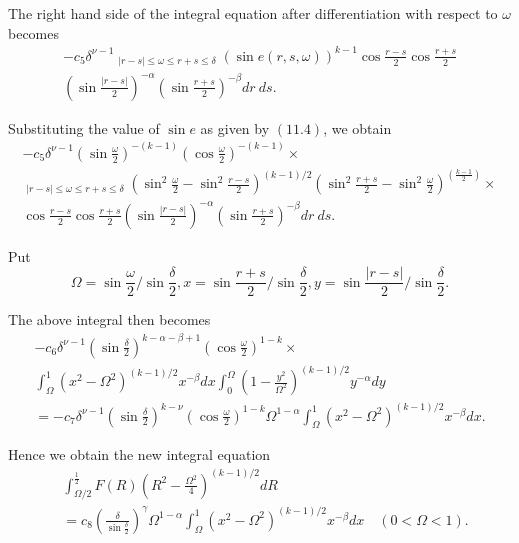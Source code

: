 The right hand side of the integral equation after differentiation with respect to $\omega$ becomes
\begin{multline*}
-c_{5} \delta^{\nu-1} \mathop{\int_{0}^{\delta} \int_{0}^{\delta}}_{|r-s|\leq \omega \leq r+s \leq \delta} (\sin e(r, s, \omega))^{k-1} \cos \frac{r-s}{2} \cos \frac{r+s}{2}\\ 
\left(\sin \frac{|r-s|}{2}\right)^{-\alpha} \left(\sin \frac{r+s}{2}\right)^{-\beta} dr ~ ds.
\end{multline*}

Substituting the value of $\sin e$ as given by $(11.4)$, we obtain
\begin{multline*}
-c_{5} \delta^{\nu-1} \left(\sin \frac{\omega}{2}\right)^{-(k-1)} \left(\cos \frac{\omega}{2}\right)^{-(k-1)} \times \\
\mathop{\int_{0}^{\delta} \int_{0}^{\delta}}_{|r-s|\leq \omega \leq r+s \leq \delta} \left(\sin^{2} \frac{\omega}{2} - \sin^{2} \frac{r-s}{2}\right)^{(k-1)/2} \left(\sin^{2} \frac{r+s}{2} - \sin^{2} \frac{\omega}{2}\right)^{\left(\frac{k-1}{2}\right)} \times\\
\cos \frac{r-s}{2} \cos \frac{r+s}{2} \left(\sin \frac{|r-s|}{2}\right)^{-\alpha} \left(\sin \frac{r+s}{2}\right)^{-\beta}dr~ds.
\end{multline*}

Put
$$
\Omega = \sin \frac{\omega}{2} / \sin \frac{\delta}{2}, x = \sin \frac{r+s}{2}/\sin \frac{\delta}{2}, y = \sin \frac{|r-s|}{2}/\sin \frac{\delta}{2}.
$$

The above integral then becomes
\begin{multline*}
-c_{6} \delta^{\nu - 1} (\sin \frac{\delta}{2})^{k-\alpha-\beta+1} (\cos \frac{\omega}{2})^{1-k} \times\\
\int_{\Omega}^{1} (x^{2} - \Omega^{2})^{(k-1)/2} x^{-\beta} dx \int_{0}^{\Omega} (1 - \frac{y^{2}}{\Omega^{2}})^{(k-1)/2} y^{-\alpha} dy\\
= -c_{7} \delta^{\nu - 1} (\sin \frac{\delta}{2})^{k-\nu} (\cos \frac{\omega}{2})^{1-k} \Omega^{1-\alpha} \int_{\Omega}^{1} (x^{2} - \Omega^{2})^{(k-1)/2} x^{-\beta} dx.
\end{multline*}

Hence we obtain the new integral equation
\begin{align*}
& \int_{\Omega/2}^{\frac{1}{2}} F(R) (R^{2} - \frac{\Omega^{2}}{4})^{(k-1)/2} dR\\
& = c_{8} \left(\frac{\delta}{\sin \frac{\delta}{2}}\right)^\gamma \Omega^{1-\alpha} \int_{\Omega}^{1} (x^{2} - \Omega^{2})^{(k-1)/2} x^{-\beta} dx \quad (0 < \Omega < 1).\tag{11.6}\label{chap2:sec11:eq11.6}
\end{align*}\pageoriginale

